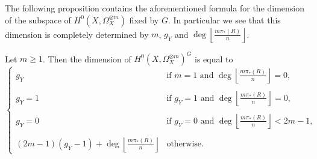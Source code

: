 The following proposition contains the aforementioned formula for the dimension of the subspace of $H^0(X,\Omega_X^{\otimes m})$ fixed by $G$.
In particular we see that this dimension is completely determined by $m$, $g_Y$ and $\deg \left\lfloor \frac{m\pi_*(R)}{n} \right\rfloor$.


\begin{prop}\label{dim}
Let $m\geq 1$. Then the dimension of $H^0(X,\Omega_X^{\otimes m})^G$ is equal to
\begin{equation*}
\begin{cases}
g_Y & \mbox{if } m=1 \mbox{ and } \deg\left\lfloor\frac{m\pi_*(R)}{n}\right\rfloor = 0, \\
\\
g_Y = 1 & \mbox{if } g_Y=1 \mbox{ and } \deg\left\lfloor\frac{m\pi_*(R)}{n}\right\rfloor = 0, \\ 
\\
g_Y = 0 & \mbox{if } g_Y=0 \mbox{ and } \deg\left\lfloor\frac{m\pi_*(R)}{n}\right\rfloor < 2m-1, \\
\\
(2m-1)(g_Y-1) + \deg\left\lfloor\frac{m\pi_*(R)}{n} \right\rfloor & \mbox{otherwise}.
\end{cases}
\end{equation*}
\end{prop}
